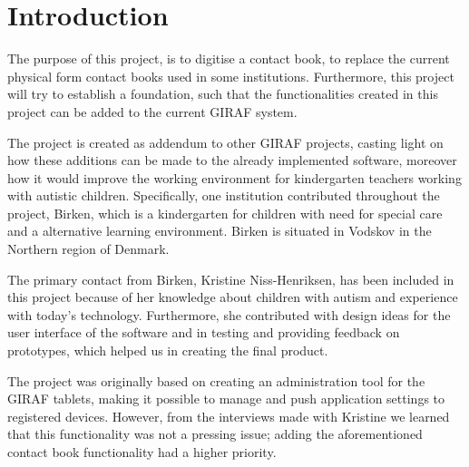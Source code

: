 \chapter{Introduction}

The purpose of this project, is to digitise a contact book, to replace the current physical form contact books used in some institutions.
Furthermore, this project will try to establish a foundation, such that the functionalities created in this project can be added to the current GIRAF system. 

The project is created as addendum to other GIRAF projects, casting light on how these additions can be made to the already implemented software, moreover how it would improve the working environment for kindergarten teachers working with autistic children. 
Specifically, one institution contributed throughout the project, Birken, which is a kindergarten for children with need for special care and a alternative learning environment. Birken is situated in Vodskov in the Northern region of Denmark.

The primary contact from Birken, Kristine Niss-Henriksen, has been included in this project because of her knowledge about children with autism and experience with today's technology. Furthermore, she contributed with design ideas for the user interface of the software and in testing and providing feedback on prototypes, which helped us in creating the final product.

The project was originally based on creating an administration tool for the GIRAF tablets, making it possible to manage and push application settings to registered devices. However, from the interviews made with Kristine we learned that this functionality was not a pressing issue; adding the aforementioned contact book functionality had a higher priority.  


